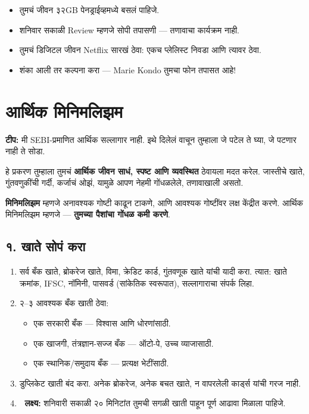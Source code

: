 \begin{itemize}
  \item तुमचं जीवन ३२GB पेनड्राईव्हमध्ये बसलं पाहिजे.  
  \item शनिवार सकाळी Review म्हणजे सोपी तपासणी — तणावाचा कार्यक्रम नाही.  
  \item तुमचं डिजिटल जीवन Netflix सारखं ठेवा: एकच प्लेलिस्ट निवडा आणि त्यावर ठेवा.  
  \item शंका आली तर कल्पना करा — Marie Kondo तुमचा फोन तपासत आहे!  
\end{itemize}


\chapter{आर्थिक मिनिमलिझम}

\textbf{टीप:} मी SEBI-प्रमाणित आर्थिक सल्लागार नाही.  
इथे दिलेलं वाचून तुम्हाला जे पटेल ते घ्या,  
जे पटणार नाही ते सोडा.  

हे प्रकरण तुम्हाला तुमचं \textbf{आर्थिक जीवन साधं, स्पष्ट आणि व्यवस्थित} ठेवायला मदत करेल.  
जास्तीचे खाते, गुंतवणुकींची गर्दी, कर्जाचं ओझं,  
यामुळे आपण नेहमी गोंधळलेले, तणावाखाली असतो.  

\textbf{मिनिमलिझम} म्हणजे अनावश्यक गोष्टी काढून टाकणे,  
आणि आवश्यक गोष्टींवर लक्ष केंद्रीत करणे.  
आर्थिक मिनिमलिझम म्हणजे — \textbf{तुमच्या पैशांचा गोंधळ कमी करणे}.  


\section*{१. खाते सोपं करा}
\begin{enumerate}
\item सर्व बँक खाते, ब्रोकरेज खाते, विमा, क्रेडिट कार्ड,  
गुंतवणूक खाते यांची यादी करा.  
त्यात: खाते क्रमांक, IFSC, नॉमिनी, पासवर्ड (सांकेतिक स्वरूपात),  
सल्लागाराचा संपर्क लिहा.  

\item २–३ आवश्यक बँक खाती ठेवा:  
\begin{itemize}
\item एक सरकारी बँक — विश्वास आणि धोरणांसाठी.  
\item एक खाजगी, तंत्रज्ञान-सज्ज बँक — ऑटो-पे, उच्च व्याजासाठी.  
\item एक स्थानिक/समुदाय बँक — प्रत्यक्ष भेटींसाठी.  
\end{itemize}

\item डुप्लिकेट खाती बंद करा.  
अनेक ब्रोकरेज, अनेक बचत खाते, न वापरलेली कार्ड्स यांची गरज नाही.  

\item 🎯 \textbf{लक्ष्य:} शनिवारी सकाळी २० मिनिटांत तुमची सगळी खाती पाहून पूर्ण आढावा मिळाला पाहिजे.  
\end{enumerate}

